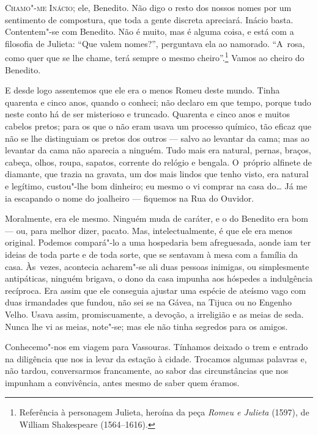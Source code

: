 \begin{linenumbers}

\textsc{Chamo"-me Inácio;} ele, Benedito. Não digo o resto dos nossos nomes por um
sentimento de compostura, que toda a gente discreta apreciará. Inácio
basta. Contentem"-se com Benedito. Não é muito, mas é alguma coisa, e
está com a filosofia de Julieta: ``Que valem nomes?'', perguntava ela ao
namorado. ``A~rosa, como quer que se lhe chame, terá sempre o mesmo
cheiro''.\footnote{Referência à personagem Julieta, heroína da peça
  \emph{Romeu e Julieta} (1597), de William Shakespeare (1564--1616).}
Vamos ao cheiro do Benedito.

E desde logo assentemos que ele era o menos Romeu deste mundo. Tinha
quarenta e cinco anos, quando o conheci; não declaro em que tempo,
porque tudo neste conto há de ser misterioso e truncado. Quarenta e
cinco anos e muitos cabelos pretos; para os que o não eram usava um
processo químico, tão eficaz que não se lhe distinguiam os pretos dos
outros --- salvo ao levantar da cama; mas ao levantar da cama não
aparecia a ninguém. Tudo mais era natural, pernas, braços, cabeça,
olhos, roupa, sapatos, corrente do relógio e bengala. O~próprio alfinete
de diamante, que trazia na gravata, um dos mais lindos que tenho visto,
era natural e legítimo, custou"-lhe bom dinheiro; eu mesmo o vi comprar
na casa do\ldots{} Já me ia escapando o nome do joalheiro --- fiquemos na Rua
do Ouvidor.

Moralmente, era ele mesmo. Ninguém muda de caráter, e o do Benedito era
bom --- ou, para melhor dizer, pacato. Mas, intelectualmente, é que ele
era menos original. Podemos compará"-lo a uma hospedaria bem afreguesada,
aonde iam ter ideias de toda parte e de toda sorte, que se sentavam à
mesa com a família da casa. Às~vezes, acontecia acharem"-se ali duas
pessoas inimigas, ou simplesmente antipáticas, ninguém brigava, o dono
da casa impunha aos hóspedes a indulgência recíproca. Era assim que ele
conseguia ajustar uma espécie de ateísmo vago com duas irmandades que
fundou, não sei se na Gávea, na Tijuca ou no Engenho Velho. Usava assim,
promiscuamente, a devoção, a irreligião e as meias de seda. Nunca lhe vi
as meias, note"-se; mas ele não tinha segredos para os amigos.

Conhecemo"-nos em viagem para Vassouras. Tínhamos deixado o trem e
entrado na diligência que nos ia levar da estação à cidade. Trocamos
algumas palavras e, não tardou, conversarmos francamente, ao sabor das
circunstâncias que nos impunham a convivência, antes mesmo de saber quem
éramos.


\end{linenumbers}
